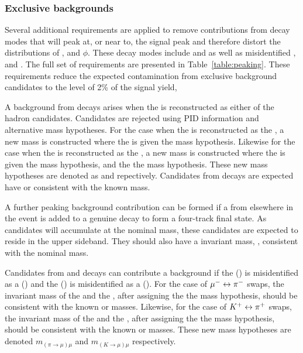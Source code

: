 \subsubsection{Exclusive backgrounds}
\label{sec:selection:exclusive}

Several additional requirements are applied to remove contributions from decay modes that will peak at, or near to, the signal peak and therefore distort the distributions of \ctl, \ctk and $\phi$. These decay modes include \LbTopKmm and \BuToKmm as well as misidentified \BdToJPsiKpi, \BdToPsitwosKpi and \BdToKpimm. The full set of requirements are presented in Table~\ref{table:peaking}. These requirements reduce the expected contamination from exclusive background candidates to the level of 2\% of the signal yield,

A background from \LbTopKmm decays arises when the \proton is reconstructed as either of the hadron candidates. Candidates are rejected using PID information and alternative mass hypotheses. For the case when the \proton is reconstructed as the \pion, a new mass is constructed where the \pion is given the \proton mass hypothesis. Likewise for the case when the \proton is reconstructed as the \kaon, a new mass is constructed where the \kaon is given the \proton mass hypothesis, and the \pion the \kaon mass hypothesis. These new mass hypotheses are denoted as \mSwappKmm and \mDoubleSwappKmm repectively. Candidates from \LbTopKmm decays are expected have \mSwappKmm or \mDoubleSwappKmm consistent with the known \Lb mass.

A further peaking background contribution can be formed if a \pim from elsewhere in the event is added to a genuine \BuToKmm decay to form a four-track final state.  As \BuToKmm candidates will accumulate at the nominal \Bp mass, these candidates are expected to reside in the upper \mkpimm sideband. They should also have a \Kp\mumu invariant mass, \mkmm, consistent with the nominal \Bp mass. 

Candidates from \BdToJPsiKpi and  \BdToPsitwosKpi decays can contribute a background if the \pim (\Kp) is misidentified as a \mun (\mup) and the \mun (\mup) is misidentified as a \pim (\Kp).  For the case of ${\mu^-} \leftrightarrow {\ensuremath{{\pi}^-}}$ swaps, the invariant mass of the \pim and the \mup, after assigning the \pim the \muon mass hypothesis, should be consistent with the known \jpsi or \psitwos masses.  Likewise, for the case of ${{K}^+} \leftrightarrow {\ensuremath{{\pi}^+}}$ swaps, the invariant mass of the \Kp and the \mun, after assigning the \Kp the \muon mass hypothesis, should be consistent with the known \jpsi or \psitwos masses. These new mass hypotheses are denoted $m_{(\pi\to\mu)\mu}$ and $m_{(K\to\mu)\mu}$ respectively.

